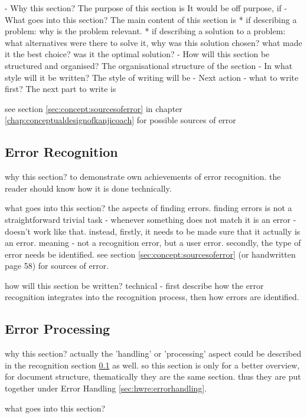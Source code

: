 - Why this section? 
  The purpose of this section is 
  It would be off purpose, if 
- What goes into this section?
  The main content of this section is 
  * if describing a problem: why is the problem relevant.
  * if describing a solution to a problem: what alternatives were
    there to solve it, why was this solution chosen? 
    what made it the best choice? was it the optimal solution?
- How will this section be structured and organised?
  The organisational structure of the section 
- In what style will it be written?
  The style of writing will be 
- Next action - what to write first?
  The next part to write is



see section \ref{sec:concept:sourcesoferror} in chapter 
\ref{chap:conceptualdesignofkanjicoach} for possible sources of error

\subsection{Error Recognition}
\label{sec:hwre:errorrecognition}



why this section? to demonstrate own achievements of error recognition.
the reader should know how it is done technically.

what goes into this section? the aspects of finding errors. finding errors
is not a straightforward trivial task - whenever something does not match
it is an error - doesn't work like that. instead, 
firstly, it needs to be made sure that it actually is an error.
meaning - not a recognition error, but a user error.
secondly, the type of error needs be identified.
see section \ref{sec:concept:sourcesoferror} (or handwritten page 58)
for sources of error.

how will this section be written?
technical - first describe how the error recognition integrates into the
recognition process, then how errors are identified.


\subsection{Error Processing}
\label{sec:hwre:errorprocessing}




why this section? 
actually the 'handling' or 'processing' aspect could be 
described in the recognition section \ref{sec:hwre:errorrecognition} as well.
so this section is only for a better overview, for document structure, 
thematically they are the same section. thus they are put together under
Error Handling \ref{sec:hwre:errorhandling}.

what goes into this section?

